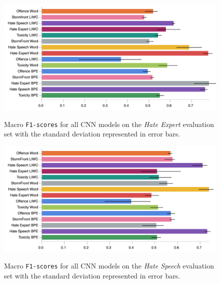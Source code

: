 
\begin{figure}
\begin{minipage}{\textwidth}
\centering
    \includegraphics[width=\textwidth]{all_cnn_waseem_test.pdf}
    \caption{Macro \texttt{F1-scores} for all CNN models on the \textit{Hate Expert} evaluation set with the standard deviation represented in error bars.}
    \label{fig:waseem_cnn_test}
    \vfill
    \includegraphics[width=\textwidth]{all_cnn_waseem_hovy_test.pdf}
    \caption{Macro \texttt{F1-scores} for all CNN models on the \textit{Hate Speech} evaluation set with the standard deviation represented in error bars.}
  \label{fig:waseem_hovy_cnn_test}
\end{minipage}
\end{figure}

